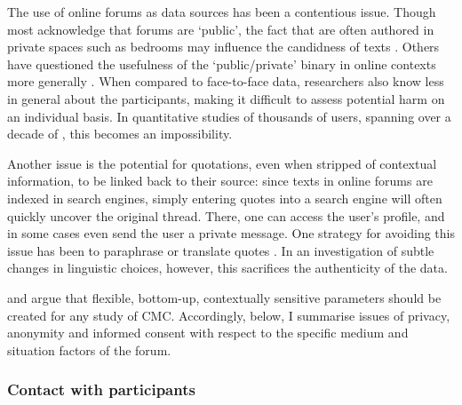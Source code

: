 The use of online \glspl{forum} as data sources has been a contentious issue. Though most acknowledge that \glspl{forum} are `public', the fact that  are often authored in private spaces such as bedrooms may influence the candidness of texts \cite{hewson_ethics_2015}. Others have questioned the usefulness of the `public\slash private' binary in online contexts more generally \cite{lange_publicly_2007}. When compared to face\hyp{}to\hyp{}face data, researchers also know less in general about the participants, making it difficult to assess potential harm on an individual basis. In quantitative studies of thousands of users, spanning over a decade of , this becomes an impossibility.

Another issue is the potential for quotations, even when stripped of contextual information, to be linked back to their source: since texts in online \glspl{forum} are indexed in search engines, simply entering quotes into a search engine will often quickly uncover the original \gls{thread}. There, one can access the user's profile, and in some cases even send the user a private message. One strategy for avoiding this issue has been to paraphrase or translate quotes \cite{stommel_use_2011,vayreda_social_2009}. In an investigation of subtle changes in linguistic choices, however, this sacrifices the authenticity of the data.



\textcite{hewson_ethics_2015} and \textcite{markham_ethical_2012} argue that flexible, bottom\hyp{}up, contextually sensitive parameters should be created for any study of \gls{CMC}. Accordingly, below, I summarise issues of privacy, anonymity and informed consent with respect to the specific medium and situation factors of the forum.

\subsubsection{Contact with participants} 

